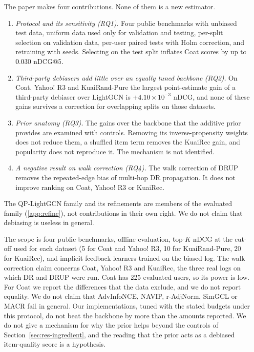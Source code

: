 The paper makes four contributions. None of them is a new estimator.
\begin{enumerate}
\item \emph{Protocol and its sensitivity (RQ1).} Four public benchmarks with unbiased test data, uniform data used only for
validation and testing, per-split selection on validation data, per-user paired tests with Holm correction, and
retraining with seeds. Selecting on the test split inflates Coat scores by up to $0.030$ nDCG@5.
\item \emph{Third-party debiasers add little over an equally tuned backbone (RQ2).} On Coat, Yahoo! R3 and KuaiRand-Pure
the largest point-estimate gain of a third-party debiaser over LightGCN is $+4.10\times10^{-3}$ nDCG, and none of these
gains survives a correction for overlapping splits on those datasets.
\item \emph{Prior anatomy (RQ3).} The gains over the backbone that the additive prior provides are examined with controls.
Removing its inverse-propensity weights does not reduce them, a shuffled item term removes the KuaiRec gain, and
popularity does not reproduce it. The mechanism is not identified.
\item \emph{A negative result on walk correction (RQ4).} The walk correction of DRUP removes the repeated-edge bias of
multi-hop DR propagation. It does not improve ranking on Coat, Yahoo! R3 or KuaiRec.
\end{enumerate}

The QP-LightGCN family and its refinements are members of the evaluated family (\ref{app:refine}), not
contributions in their own right. We do not claim that debiasing is useless in general.

The scope is four public benchmarks, offline evaluation, top-$K$ nDCG at the cut-off used for each dataset (5 for Coat
and Yahoo! R3, 10 for KuaiRand-Pure, 20 for KuaiRec), and implicit-feedback learners trained on the biased log. The
walk-correction claim concerns Coat, Yahoo! R3 and KuaiRec, the three real logs on which DR and DRUP were run. Coat has
225 evaluated users, so its power is low. For Coat we report the differences that the data exclude, and we do not report
equality. We do not claim that AdvInfoNCE, NAVIP, r-AdjNorm, SimGCL or MACR fail in general. Our implementations, tuned
with the stated budgets under this protocol, do not beat the backbone by more than the amounts reported. We do not give a
mechanism for why the prior helps beyond the controls of Section~\ref{sec:res-ingredient}, and the reading that the
prior acts as a debiased item-quality score is a hypothesis.
